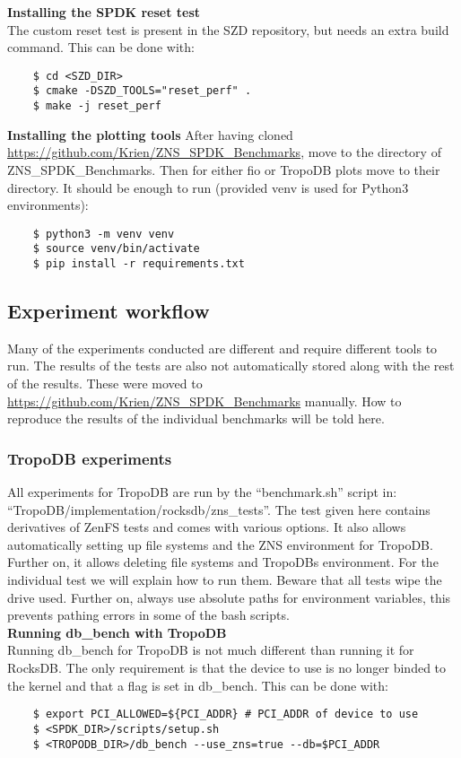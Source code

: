 \textbf{Installing the SPDK reset test}\\
The custom reset test is present in the SZD repository, but needs an extra build command. This can be done with:
\begin{verbatim}
    $ cd <SZD_DIR>
    $ cmake -DSZD_TOOLS="reset_perf" .
    $ make -j reset_perf
\end{verbatim}

\textbf{Installing the plotting tools}
After having cloned \url{https://github.com/Krien/ZNS_SPDK_Benchmarks}, move to the directory of ZNS\_SPDK\_Benchmarks. Then for either fio or TropoDB plots move to their directory. It should be enough to run (provided venv is used for Python3 environments):
\begin{verbatim}
    $ python3 -m venv venv
    $ source venv/bin/activate
    $ pip install -r requirements.txt
\end{verbatim}

\subsection{Experiment workflow}
Many of the experiments conducted are different and require different tools to run. The results of the tests are also not automatically stored along with the rest of the results. These were moved to  \url{https://github.com/Krien/ZNS_SPDK_Benchmarks} manually. How to reproduce the results of the individual benchmarks will be told here.

\subsubsection{TropoDB experiments}
All experiments for TropoDB are run by the ``benchmark.sh'' script in: \\ ``TropoDB/implementation/rocksdb/zns\_tests''. The test given here contains derivatives of ZenFS tests and comes with various options. It also allows automatically setting up file systems and the ZNS environment for TropoDB. Further on, it allows deleting file systems and TropoDBs environment. For the individual test we will explain how to run them. Beware that all tests wipe the drive used. Further on, always use absolute paths for environment variables, this prevents pathing errors in some of the bash scripts. \\

\textbf{Running db\_bench with TropoDB}\\
Running db\_bench for TropoDB is not much different than running it for RocksDB. The only requirement is that the device to use is no longer binded to the kernel and that a flag is set in db\_bench. This can be done with:
\begin{verbatim}
    $ export PCI_ALLOWED=${PCI_ADDR} # PCI_ADDR of device to use
    $ <SPDK_DIR>/scripts/setup.sh
    $ <TROPODB_DIR>/db_bench --use_zns=true --db=$PCI_ADDR
\end{verbatim}


